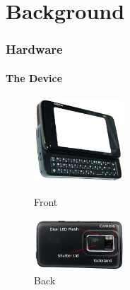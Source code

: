 %
%
%
%
%

\part{Background}
\section{Hardware}

\subsection{The Device}

\begin{figure}
	\vspace{-40pt}
	\begin{center}
		\includegraphics[width=0.3\textwidth]{../images/wiki_n900}
	\end{center}
	\vspace{-20pt}
	\caption{Front}
	\vspace{30pt}
	\begin{center}
		\includegraphics[width=0.3\textwidth]{../images/N900back}
	\end{center}
	\vspace{-20pt}
	\caption{Back}
\end{figure}

